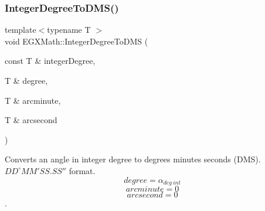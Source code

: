 \mbox{\label{group___e_g_x_math-_angle_conversions-_integer_degree_gaf76779bcc23268b41d4c3a7610d60eaf}} 
\subsubsection{\texorpdfstring{Integer\+Degree\+To\+D\+M\+S()}{IntegerDegreeToDMS()}}
{\footnotesize\ttfamily template$<$typename T $>$ \\
void E\+G\+X\+Math\+::\+Integer\+Degree\+To\+D\+MS (\begin{DoxyParamCaption}\item[{const T \&}]{integer\+Degree,  }\item[{T \&}]{degree,  }\item[{T \&}]{arcminute,  }\item[{T \&}]{arcsecond }\end{DoxyParamCaption})}



Converts an angle in integer degree to degrees minutes seconds (D\+MS). ${DD}^{\circ}{MM}'{SS.SS}''$ format. \[degree=\alpha_{deg\ int}\] \[arcminute= 0\] \[arcsecond= 0\]. 

